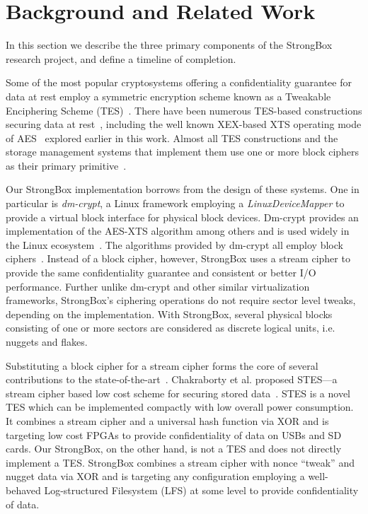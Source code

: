\chapter{Background and Related Work} \label{chp:related}

In this section we describe the three primary components of the StrongBox
research project, and define a timeline of completion.

Some of the most popular cryptosystems offering a confidentiality
guarantee for data at rest employ a symmetric encryption scheme known
as a Tweakable Enciphering Scheme (TES)~\cite{STES,XEX}. There have
been numerous TES-based constructions securing data at
rest~\cite{STES,CMC,HCTR}, including the well known XEX-based XTS
operating mode of AES~\cite{XTS} explored earlier in this work. Almost
all TES constructions and the storage management systems that
implement them use one or more block ciphers as their primary
primitive~\cite{TES-From-Stream-Cipher,STES}.

Our StrongBox implementation borrows from the design of these systems. One in
particular is \emph{dm-crypt}, a Linux framework employing a
\textit{LinuxDeviceMapper} to provide a virtual block interface for physical
block devices. Dm-crypt provides an implementation of the AES-XTS algorithm among
others and is used widely in the Linux ecosystem~\cite{DmC-Android, dmcrypt}.
The algorithms provided by dm-crypt all employ block ciphers~\cite{dmcrypt}.
Instead of a block cipher, however, StrongBox uses a stream cipher to provide
the same confidentiality guarantee and consistent or better I/O performance.
Further unlike dm-crypt and other similar virtualization frameworks, StrongBox's
ciphering operations do not require sector level tweaks, depending on the
implementation. With StrongBox, several physical blocks consisting of one or
more sectors are considered as discrete logical units, i.e. nuggets and flakes.

Substituting a block cipher for a stream cipher forms the core of several
contributions to the state-of-the-art~\cite{STES, TES-From-Stream-Cipher}.
Chakraborty et al. proposed STES---a stream cipher based low cost scheme for
securing stored data~\cite{STES}. STES is a novel TES which can be implemented
compactly with low overall power consumption. It combines a stream cipher and a
universal hash function via XOR and is targeting low cost FPGAs to provide
confidentiality of data on USBs and SD cards. Our StrongBox, on the other hand,
is not a TES and does not directly implement a TES. StrongBox combines a stream
cipher with nonce ``tweak'' and nugget data via XOR and is targeting any
configuration employing a well-behaved Log-structured Filesystem (LFS) at some
level to provide confidentiality of data.

